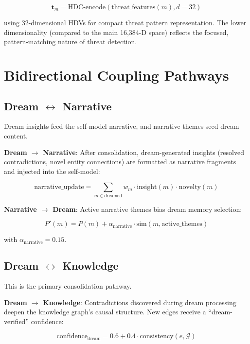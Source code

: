\documentclass[11pt,a4paper]{article}
\begin{document}
\begin{equation}
\mathbf{t}_m = \text{HDC-encode}(\text{threat\_features}(m), d = 32)
\end{equation}

using 32-dimensional HDVs for compact threat pattern representation. The lower dimensionality (compared to the main 16,384-D space) reflects the focused, pattern-matching nature of threat detection.

\section{Bidirectional Coupling Pathways}

\subsection{Dream $\leftrightarrow$ Narrative}

Dream insights feed the self-model narrative, and narrative themes seed dream content.

\textbf{Dream $\to$ Narrative}: After consolidation, dream-generated insights (resolved contradictions, novel entity connections) are formatted as narrative fragments and injected into the self-model:

\begin{equation}
\text{narrative\_update} = \sum_{m \in \text{dreamed}} w_m \cdot \text{insight}(m) \cdot \text{novelty}(m)
\end{equation}

\textbf{Narrative $\to$ Dream}: Active narrative themes bias dream memory selection:

\begin{equation}
P'(m) = P(m) + \alpha_{\text{narrative}} \cdot \text{sim}(m, \text{active\_themes})
\end{equation}

with $\alpha_{\text{narrative}} = 0.15$.

\subsection{Dream $\leftrightarrow$ Knowledge}

This is the primary consolidation pathway.

\textbf{Dream $\to$ Knowledge}: Contradictions discovered during dream processing deepen the knowledge graph's causal structure. New edges receive a ``dream-verified'' confidence:

\begin{equation}
\text{confidence}_{\text{dream}} = 0.6 + 0.4 \cdot \text{consistency}(e, \mathcal{G})
\end{equation}
\end{document}
